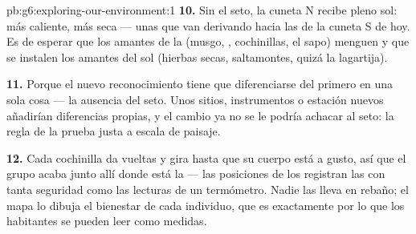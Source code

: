 \begin{solution}{pb:g6:exploring-our-environment:1}
\textbf{10.} Sin el seto, la cuneta N recibe pleno sol: más caliente,
más seca --- unas  que van derivando hacia las de la cuneta
S de hoy. Es de esperar que los amantes de la  (musgo,
, cochinillas, el sapo) menguen y que se instalen los amantes
del sol (hierbas secas, saltamontes, quizá la lagartija).

\textbf{11.} Porque el nuevo reconocimiento tiene que diferenciarse
del primero en una sola cosa --- la ausencia del seto. Unos sitios,
instrumentos o estación nuevos añadirían diferencias propias, y el
cambio ya no se le podría achacar al seto: la regla de la prueba justa
a escala de paisaje.

\textbf{12.} Cada cochinilla da vueltas y gira hasta que su cuerpo
está a gusto, así que el grupo acaba junto allí donde está la 
--- las posiciones de los  registran las  con tanta
seguridad como las lecturas de un termómetro. Nadie las lleva en
rebaño; el mapa lo dibuja el bienestar de cada individuo, que es
exactamente por lo que los habitantes se pueden leer como medidas.
\end{solution}
